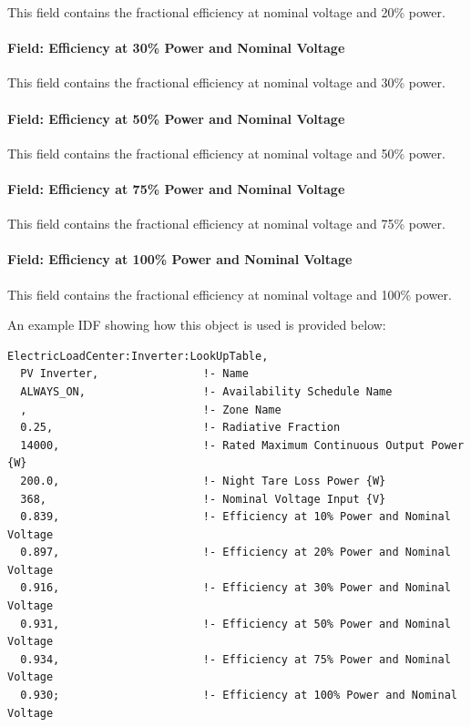 This field contains the fractional efficiency at nominal voltage and 20\% power.

\paragraph{Field: Efficiency at 30\% Power and Nominal Voltage}\label{field-efficiency-at-30-power-and-nominal-voltage}

This field contains the fractional efficiency at nominal voltage and 30\% power.

\paragraph{Field: Efficiency at 50\% Power and Nominal Voltage}\label{field-efficiency-at-50-power-and-nominal-voltage}

This field contains the fractional efficiency at nominal voltage and 50\% power.

\paragraph{Field: Efficiency at 75\% Power and Nominal Voltage}\label{field-efficiency-at-75-power-and-nominal-voltage}

This field contains the fractional efficiency at nominal voltage and 75\% power.

\paragraph{Field: Efficiency at 100\% Power and Nominal Voltage}\label{field-efficiency-at-100-power-and-nominal-voltage}

This field contains the fractional efficiency at nominal voltage and 100\% power.

An example IDF showing how this object is used is provided below:

\begin{lstlisting}
ElectricLoadCenter:Inverter:LookUpTable,
  PV Inverter,                !- Name
  ALWAYS_ON,                  !- Availability Schedule Name
  ,                           !- Zone Name
  0.25,                       !- Radiative Fraction
  14000,                      !- Rated Maximum Continuous Output Power {W}
  200.0,                      !- Night Tare Loss Power {W}
  368,                        !- Nominal Voltage Input {V}
  0.839,                      !- Efficiency at 10% Power and Nominal Voltage
  0.897,                      !- Efficiency at 20% Power and Nominal Voltage
  0.916,                      !- Efficiency at 30% Power and Nominal Voltage
  0.931,                      !- Efficiency at 50% Power and Nominal Voltage
  0.934,                      !- Efficiency at 75% Power and Nominal Voltage
  0.930;                      !- Efficiency at 100% Power and Nominal Voltage
\end{lstlisting}

